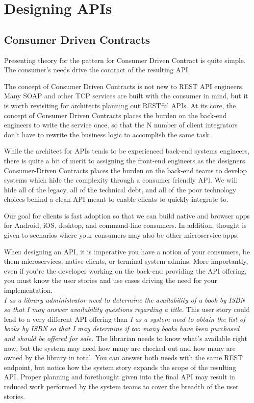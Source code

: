 \chapter{Designing APIs}

\section{Consumer Driven Contracts}

Presenting theory for the pattern for Consumer Driven Contract is quite simple.  The consumer's needs drive the contract of the resulting API.

The concept of Consumer Driven Contracts is not new to REST API engineers.  Many SOAP and other TCP services are built with the consumer in mind, but it is worth revisiting for architects planning out RESTful APIs.  At its core, the concept of Consumer Driven Contracts places the burden on the back-end engineers to write the service once, so that the N number of client integrators don't have to rewrite the business logic to accomplish the same task.

While the architect for APIs tends to be experienced back-end systems engineers, there is quite a bit of merit to assigning the front-end engineers as the designers. Consumer-Driven Contracts places the burden on the back-end teams to develop systems which hide the complexity through a consumer friendly API. We will hide all of the legacy, all of the technical debt, and all of the poor technology choices behind a clean API meant to enable clients to quickly integrate to.

Our goal for clients is fast adoption so that we can build native and browser apps for Android, iOS, desktop, and command-line consumers.  In addition, thought is given to scenarios where your consumers may also be other microservice apps.

When designing an API, it is imperative you have a notion of your consumers, be them microservices, native clients, or terminal system admins.  More importantly, even if you're the developer working on the back-end providing the API offering, you must know the user stories and use cases driving the need for your implementation.  \\\textit{ I as a library administrator need to determine the availability of a book by ISBN so that I may answer availability questions regarding a title.}  This user story could lead to a very different API offering than \textit{I as a system need to obtain the list of books by ISBN so that I may determine if too many books have been purchased and should be offered for sale.}  The librarian needs to know what's available right now, but the system may need how many are checked out and how many are owned by the library in total.  You can answer both needs with the same REST endpoint, but notice how the system story expands the scope of the resulting API.  Proper planning and forethought given into the final API may result in reduced work performed by the system teams to cover the breadth of the user stories.

